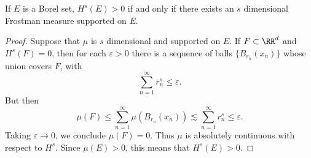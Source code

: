 \begin{theorem}
	If $E$ is a Borel set, $H^s(E) > 0$ if and only if there exists an $s$ dimensional Frostman measure supported on $E$.
\end{theorem}
\begin{proof}
	Suppose that $\mu$ is $s$ dimensional and supported on $E$. If $F \subset \RR^d$ and $H^s(F) = 0$, then for each $\varepsilon > 0$ there is a sequence of balls $\{ B_{r_n}(x_n) \}$ whose union covers $F$, with
	\[ \sum_{n = 1}^\infty r_n^s \leq \varepsilon. \]
	But then
	\[ \mu(F) \leq \sum_{n = 1}^\infty \mu(B_{r_n}(x_n)) \lesssim \sum_{n = 1}^\infty r_n^s \leq \varepsilon. \]
	Taking $\varepsilon \to 0$, we conclude $\mu(F) = 0$. Thus $\mu$ is absolutely continuous with respect to $H^s$. Since $\mu(E) > 0$, this means that $H^s(E) > 0$.


\end{proof}
